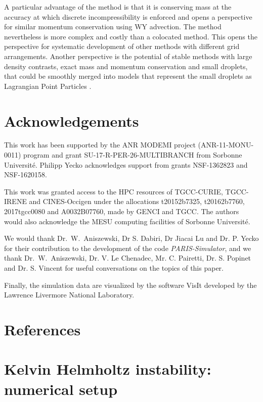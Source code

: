 \documentclass[times,final]{elsarticle}
\begin{document}
A particular advantage of the method is that it is conserving mass at the 
accuracy at which discrete incompressibility is enforced and opens a
perspective for similar momentum conservation using WY advection.
The method nevertheless is more complex and costly than a colocated method. 
This opens the perspective for systematic development of other methods with 
different grid arrangements. Another perspective is the potential
of stable methods with large density contrasts, exact mass and momentum conservation 
and small droplets, that could be smoothly merged into models that represent 
the small droplets as Lagrangian Point Particles \cite{Ling15}.

\section{Acknowledgements} %

This work has been supported by the ANR MODEMI project (ANR-11-MONU-0011) program and grant 
SU-17-R-PER-26-MULTIBRANCH from Sorbonne Universit\'e.
%
Philipp Yecko acknowledges support from grants NSF-1362823 and NSF-1620158.
%

This work was granted access to the HPC resources of TGCC-CURIE, TGCC-IRENE and CINES-Occigen under the allocations 
t20152b7325,  t20162b7760, 2017tgcc0080 and A0032B07760, made by GENCI and TGCC. 
The authors would also acknowledge the MESU 
computing facilities of Sorbonne Universit\'e. 

We would thank Dr.\ W.\ Aniszewski, Dr S. Dabiri, Dr Jiacai Lu and Dr. P. Yecko for their contribution to the development of the code \emph{PARIS-Simulator}, and we thank   Dr.\ W.\ Aniszewski, Dr. V. Le Chenadec, Mr. C. Pairetti, Dr. S. Popinet and Dr. S. Vincent for useful conversations on the topics of this paper.  

Finally, the simulation data are visualized by the software VisIt developed by the Lawrence Livermore National Laboratory. 



\section*{References}
 

\appendix
\section{Kelvin Helmholtz instability: numerical setup}

\end{document}
